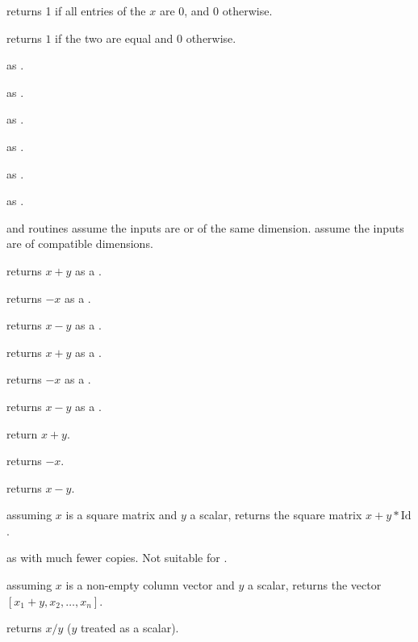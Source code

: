  returns 1 if all entries of the  $x$ are $0$,
and $0$ otherwise.

 returns $1$ if the two  are equal
and $0$ otherwise.

 as .

 as .

 as .

 as .

 as .

 as .


 and  routines assume the inputs are  or 
of the same dimension.  assume the inputs are  of
compatible dimensions.

 returns $x + y$ as a .

 returns $-x$ as a .

 returns $x - y$ as a .

 returns $x + y$ as a .

 returns $-x$ as a .

 returns $x - y$ as a .

 return $x+y$.

 returns $-x$.

 returns $x-y$.

 assuming $x$ is a square matrix
and $y$ a scalar, returns the square matrix $x + y*\text{Id}$.

 as  with much
fewer copies. Not suitable for .

 assuming $x$ is a non-empty column vector
and $y$ a scalar, returns the vector $[x_1 + y, x_2,\dots,x_n]$.


 returns $x/y$ ($y$ treated as a scalar).

